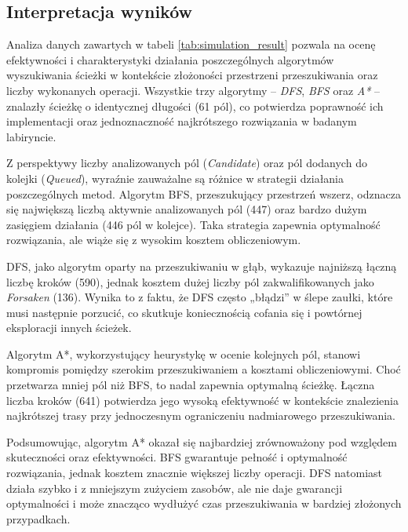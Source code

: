 \documentclass[../doc.tex]{subfiles}
\begin{document}
\subsection{Interpretacja wyników}

Analiza danych zawartych w tabeli \ref{tab:simulation_result} pozwala na ocenę efektywności i charakterystyki działania poszczególnych algorytmów wyszukiwania ścieżki w kontekście złożoności przestrzeni przeszukiwania oraz liczby wykonanych operacji. Wszystkie trzy algorytmy – \textit{DFS}, \textit{BFS} oraz \textit{A*} – znalazły ścieżkę o identycznej długości (61 pól), co potwierdza poprawność ich implementacji oraz jednoznaczność najkrótszego rozwiązania w badanym labiryncie.

Z perspektywy liczby analizowanych pól (\textit{Candidate}) oraz pól dodanych do kolejki (\textit{Queued}), wyraźnie zauważalne są różnice w strategii działania poszczególnych metod. Algorytm BFS, przeszukujący przestrzeń wszerz, odznacza się największą liczbą aktywnie analizowanych pól (447) oraz bardzo dużym zasięgiem działania (446 pól w kolejce). Taka strategia zapewnia optymalność rozwiązania, ale wiąże się z wysokim kosztem obliczeniowym. 

DFS, jako algorytm oparty na przeszukiwaniu w głąb, wykazuje najniższą łączną liczbę kroków (590), jednak kosztem dużej liczby pól zakwalifikowanych jako \textit{Forsaken} (136). Wynika to z faktu, że DFS często „błądzi” w ślepe zaułki, które musi następnie porzucić, co skutkuje koniecznością cofania się i powtórnej eksploracji innych ścieżek. 

Algorytm A*, wykorzystujący heurystykę w ocenie kolejnych pól, stanowi kompromis pomiędzy szerokim przeszukiwaniem a kosztami obliczeniowymi. Choć przetwarza mniej pól niż BFS, to nadal zapewnia optymalną ścieżkę. Łączna liczba kroków (641) potwierdza jego wysoką efektywność w kontekście znalezienia najkrótszej trasy przy jednoczesnym ograniczeniu nadmiarowego przeszukiwania.

Podsumowując, algorytm A* okazał się najbardziej zrównoważony pod względem skuteczności oraz efektywności. BFS gwarantuje pełność i optymalność rozwiązania, jednak kosztem znacznie większej liczby operacji. DFS natomiast działa szybko i z mniejszym zużyciem zasobów, ale nie daje gwarancji optymalności i może znacząco wydłużyć czas przeszukiwania w bardziej złożonych przypadkach.
\end{document}
